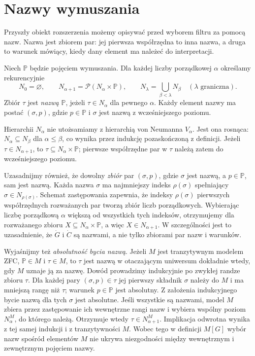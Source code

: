 \section{Nazwy wymuszania}
Przyszły obiekt rozszerzenia możemy opisywać
przed wyborem filtru za pomocą nazw. Nazwa jest
zbiorem par: jej pierwsza współrzędna to
inna nazwa, a druga to warunek mówiący,
kiedy dany element ma należeć do interpretacji.

\begin{definicja}\label{def:forcing-names}
Niech $\mathbb P$ będzie pojęciem wymuszania.
Dla każdej liczby porządkowej $\alpha$ określamy
rekurencyjnie
\[
 N_0=\varnothing,\qquad
 N_{\alpha+1}=\mathcal P(N_\alpha\times\mathbb P),
 \qquad
 N_\lambda=\bigcup_{\beta<\lambda}N_\beta
 \quad(\lambda\text{ graniczna}).
\]
Zbiór $\tau$ jest \emph{nazwą $\mathbb P$},
jeżeli $\tau\in N_\alpha$ dla pewnego $\alpha$.
Każdy element nazwy ma postać $(\sigma,p)$,
gdzie $p\in\mathbb P$ i $\sigma$
jest nazwą z wcześniejszego poziomu.
\end{definicja}

\begin{uwaga}
\label{rem:forcing-name-rank}
Hierarchii $N_\alpha$ nie utożsamiamy
z hierarchią von Neumanna $V_\alpha$.
Jest ona rosnąca: $N_\alpha\subseteq N_\beta$
dla $\alpha\leq\beta$, co wynika
przez indukcję pozaskończoną z definicji.
Jeżeli $\tau\in N_{\alpha+1}$, to
$\tau\subseteq N_\alpha\times\mathbb P$;
pierwsze współrzędne par w $\tau$
należą zatem do wcześniejszego poziomu.

Uzasadnijmy również, że dowolny
\emph{zbiór} par $(\sigma,p)$,
gdzie $\sigma$ jest nazwą, a $p\in\mathbb P$,
sam jest nazwą. Każda nazwa $\sigma$
ma najmniejszy indeks $\rho(\sigma)$
spełniający $\sigma\in N_{\rho(\sigma)}$.
Schemat zastępowania zapewnia, że
indeksy $\rho(\sigma)$ pierwszych
współrzędnych rozważanych par
tworzą zbiór liczb porządkowych.
Wybierając liczbę porządkową $\alpha$
większą od wszystkich tych indeksów,
otrzymujemy dla rozważanego zbioru
$X\subseteq N_\alpha\times\mathbb P$,
a więc $X\in N_{\alpha+1}$.
W szczególności jest to uzasadnienie,
że $\dot G$ i $\dot C$ są nazwami,
a nie tylko zbiorami par nazw i warunków.

Wyjaśnijmy też \emph{absolutność bycia nazwą}.
Jeżeli $M$ jest tranzytywnym modelem ZFC,
$\mathbb P\in M$ i $\tau\in M$, to
$\tau$ jest nazwą w otaczającym uniwersum
dokładnie wtedy, gdy $M$ uznaje ją za nazwę.
Dowód prowadzimy indukcyjnie po zwykłej randze
zbioru $\tau$. Dla każdej pary
$(\sigma,p)\in\tau$ jej pierwszy składnik
$\sigma$ należy do $M$ i ma mniejszą
rangę niż $\tau$; warunek $p\in\mathbb P$
jest absolutny. Z założenia indukcyjnego
bycie nazwą dla tych $\sigma$ jest absolutne.
Jeśli wszystkie są nazwami, model $M$
zbiera przez zastępowanie ich wewnętrzne
rangi nazw i wybiera wspólny poziom
$N_\alpha^M$, do którego należą.
Otrzymuje wtedy
$\tau\in N_{\alpha+1}^M$.
Implikacja odwrotna wynika z tej samej
indukcji i z tranzytywności $M$.
Wobec tego w definicji $M[G]$
wybór nazw spośród elementów $M$
nie ukrywa niezgodności między
wewnętrznym i zewnętrznym pojęciem nazwy.
\end{uwaga}

